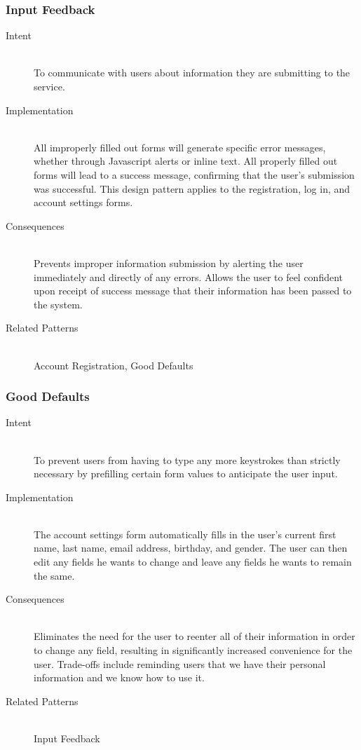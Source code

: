 		\subsubsection{Input Feedback}
			\begin{description}
				\item[Intent] \hfill \\
					To communicate with users about information they are submitting to the service.
				\item[Implementation] \hfill \\
					All improperly filled out forms will generate specific error messages, whether through Javascript alerts or inline text. All properly filled out forms will lead to a success message, confirming that the user's submission was successful. This design pattern applies to the registration, log in, and account settings forms.
				\item[Consequences] \hfill \\
					Prevents improper information submission by alerting the user immediately and directly of any errors. Allows the user to feel confident upon receipt of success message that their information has been passed to the system.
				\item[Related Patterns] \hfill \\
					Account Registration, Good Defaults
			\end{description}
			
		\subsubsection{Good Defaults}
			\begin{description}
				\item[Intent] \hfill \\
					To prevent users from having to type any more keystrokes than strictly necessary by prefilling certain form values to anticipate the user input.
				\item[Implementation] \hfill \\
					The account settings form automatically fills in the user's current first name, last name, email address, birthday, and gender. The user can then edit any fields he wants to change and leave any fields he wants to remain the same.
				\item[Consequences] \hfill \\
					Eliminates the need for the user to reenter all of their information in order to change any field, resulting in significantly increased convenience for the user. Trade-offs include reminding users that we have their personal information and we know how to use it.
				\item[Related Patterns] \hfill \\
					Input Feedback
			\end{description}
